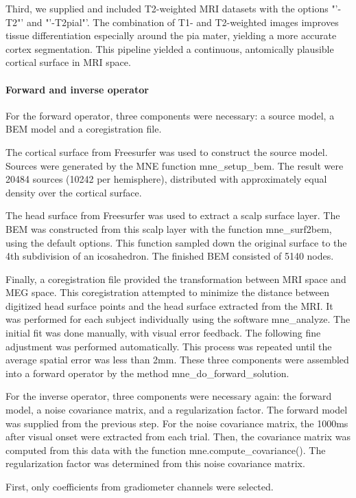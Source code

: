 Third, we supplied and included T2-weighted MRI datasets with the options "'-T2"' and "'-T2pial"'.
The combination of T1- and T2-weighted images improves tissue differentiation especially around the pia mater, yielding a more accurate cortex segmentation.
This pipeline yielded a continuous, antomically plausible cortical surface in MRI space.


\paragraph{Forward and inverse operator}
For the forward operator, three components were necessary: a source model, a BEM model and a coregistration file.

The cortical surface from Freesurfer was used to construct the source model.
Sources were generated by the MNE function mne\_setup\_bem.
The result were 20484 sources (10242 per hemisphere), distributed with approximately equal density over the cortical surface.

The head surface from Freesurfer was used to extract a scalp surface layer.
The BEM was constructed from this scalp layer with the function mne\_surf2bem, using the default options.
This function sampled down the original surface to the 4th subdivision of an icosahedron.
The finished BEM consisted of 5140 nodes.

Finally, a coregistration file provided the transformation between MRI space and MEG space.
This coregistration attempted to minimize the distance between digitized head surface points and the head surface extracted from the MRI. 
It was performed for each subject individually using the software mne\_analyze.
The initial fit was done manually, with visual error feedback.
The following fine adjustment was performed automatically.
This process was repeated until the average spatial error was less than 2mm.
These three components were assembled into a forward operator by the method mne\_do\_forward\_solution.


For the inverse operator, three components were necessary again: the forward model, a noise covariance matrix, and a regularization factor.
The forward model was supplied from the previous step.
For the noise covariance matrix, the 1000ms after visual onset were extracted from each trial.
Then, the covariance matrix was computed from this data with the function mne.compute\_covariance().
The regularization factor was determined from this noise covariance matrix.

First, only coefficients from gradiometer channels were selected.

